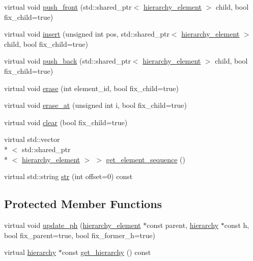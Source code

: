 \begin{DoxyCompactItemize}
\item 
virtual void \hyperlink{classmae_1_1hierarchy__element_a015f7a56e2b0001c905aed686a423665}{push\-\_\-front} (std\-::shared\-\_\-ptr$<$ \hyperlink{classmae_1_1hierarchy__element}{hierarchy\-\_\-element} $>$ child, bool fix\-\_\-child=true)
\item 
virtual void \hyperlink{classmae_1_1hierarchy__element_ade11a0f901e7104b18e71e25f0ab5fe0}{insert} (unsigned int pos, std\-::shared\-\_\-ptr$<$ \hyperlink{classmae_1_1hierarchy__element}{hierarchy\-\_\-element} $>$ child, bool fix\-\_\-child=true)
\item 
virtual void \hyperlink{classmae_1_1hierarchy__element_a33f4004da181064619e20791982a81c9}{push\-\_\-back} (std\-::shared\-\_\-ptr$<$ \hyperlink{classmae_1_1hierarchy__element}{hierarchy\-\_\-element} $>$ child, bool fix\-\_\-child=true)
\item 
virtual void \hyperlink{classmae_1_1hierarchy__element_ab2484909e7a0d989f339f2234382da5d}{erase} (int element\-\_\-id, bool fix\-\_\-child=true)
\item 
virtual void \hyperlink{classmae_1_1hierarchy__element_ae2f8cb1ff8cff0d33756341a4735091d}{erase\-\_\-at} (unsigned int i, bool fix\-\_\-child=true)
\item 
virtual void \hyperlink{classmae_1_1hierarchy__element_acc80ce0edf77ed2a29f677438d42a514}{clear} (bool fix\-\_\-child=true)
\item 
virtual std\-::vector\\*
$<$ std\-::shared\-\_\-ptr\\*
$<$ \hyperlink{classmae_1_1hierarchy__element}{hierarchy\-\_\-element} $>$ $>$ \hyperlink{classmae_1_1hierarchy__element_a306743949952f8694e793558973fbabf}{get\-\_\-element\-\_\-sequence} ()
\item 
virtual std\-::string \hyperlink{classmae_1_1hierarchy__element_a42654844c523a6bce075a9b0972ac0e7}{str} (int offset=0) const 
\end{DoxyCompactItemize}
\subsection*{Protected Member Functions}
\begin{DoxyCompactItemize}
\item 
virtual void \hyperlink{classmae_1_1hierarchy__element_ab97cfdd7cfe08f08402c3f9f7e49c936}{update\-\_\-ph} (\hyperlink{classmae_1_1hierarchy__element}{hierarchy\-\_\-element} $\ast$const parent, \hyperlink{classmae_1_1hierarchy}{hierarchy} $\ast$const h, bool fix\-\_\-parent=true, bool fix\-\_\-former\-\_\-h=true)
\item 
virtual \hyperlink{classmae_1_1hierarchy}{hierarchy} $\ast$const \hyperlink{classmae_1_1hierarchy__element_aae6c2ecb6e57bfb448a28dc5e9e31cf4}{get\-\_\-hierarchy} () const 
\end{DoxyCompactItemize}
